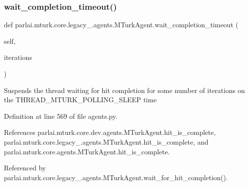 \mbox{\label{classparlai_1_1mturk_1_1core_1_1legacy__2018_1_1agents_1_1MTurkAgent_af12ef4e56cea2b9800123c43227513d8}} 
\subsubsection{\texorpdfstring{wait\+\_\+completion\+\_\+timeout()}{wait\_completion\_timeout()}}
{\footnotesize\ttfamily def parlai.\+mturk.\+core.\+legacy\+\_.\+agents.\+M\+Turk\+Agent.\+wait\+\_\+completion\+\_\+timeout (\begin{DoxyParamCaption}\item[{}]{self,  }\item[{}]{iterations }\end{DoxyParamCaption})}

\begin{DoxyVerb}Suspends the thread waiting for hit completion for some number of
iterations on the THREAD_MTURK_POLLING_SLEEP time\end{DoxyVerb}
 

Definition at line 569 of file agents.\+py.



References parlai.\+mturk.\+core.\+dev.\+agents.\+M\+Turk\+Agent.\+hit\+\_\+is\+\_\+complete, parlai.\+mturk.\+core.\+legacy\+\_.\+agents.\+M\+Turk\+Agent.\+hit\+\_\+is\+\_\+complete, and parlai.\+mturk.\+core.\+agents.\+M\+Turk\+Agent.\+hit\+\_\+is\+\_\+complete.



Referenced by parlai.\+mturk.\+core.\+legacy\+\_.\+agents.\+M\+Turk\+Agent.\+wait\+\_\+for\+\_\+hit\+\_\+completion().

